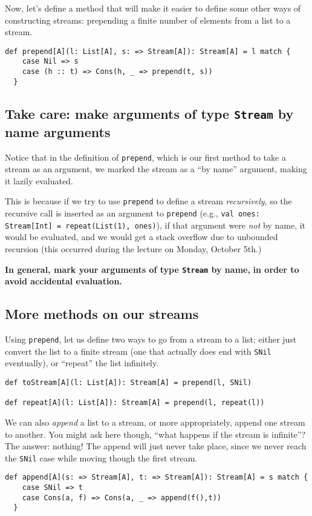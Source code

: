 \documentclass[11pt]{article}
\begin{document}
Now, let's define a method that will make it easier
to define some other ways of constructing streams:
prepending a finite number of elements from a list
to a stream.
\begin{verbatim}
def prepend[A](l: List[A], s: => Stream[A]): Stream[A] = l match {
    case Nil => s
    case (h :: t) => Cons(h, _ => prepend(t, s))
  }
\end{verbatim}

\subsection{Take care: \textbf{make arguments of type \texttt{Stream} by name arguments}}
\label{sec:org6ebf465}

Notice that in the definition of \texttt{prepend},
which is our first method to take a stream as an argument,
we marked the stream as a “by name” argument,
making it lazily evaluated.

This is because if we try to
use \texttt{prepend} to define a stream \emph{recursively},
so the recursive call is inserted as an argument
to \texttt{prepend} (e.g., \texttt{val ones: Stream[Int] = repeat(List(1), ones)}),
if that argument were \emph{not} by name, it would be evaluated,
and we would get a stack overflow due to unbounded recursion
(this occurred during the lecture on Monday, October 5th.)

\begin{center}
\textbf{In general, mark your arguments of type \texttt{Stream} by name,}
\textbf{in order to avoid accidental evaluation.}
\end{center}

\subsection{More methods on our streams}
\label{sec:org9df2f0a}

Using \texttt{prepend}, let us define two ways
to go from a stream to a list;
either just convert the list to a finite stream
(one that actually does end with \texttt{SNil} eventually),
or “repeat” the list infinitely.
\begin{verbatim}
def toStream[A](l: List[A]): Stream[A] = prepend(l, SNil)

def repeat[A](l: List[A]): Stream[A] = prepend(l, repeat(l))
\end{verbatim}

We can also \emph{append} a list to a stream, or more appropriately,
append one stream to another.
You might ask here though,
“what happens if the stream is infinite”?
The answer: nothing! The append will just never take place,
since we never reach the \texttt{SNil} case while moving
though the first stream.
\begin{verbatim}
def append[A](s: => Stream[A], t: => Stream[A]): Stream[A] = s match {
    case SNil => t
    case Cons(a, f) => Cons(a, _ => append(f(),t))
  }
\end{verbatim}
\end{document}
